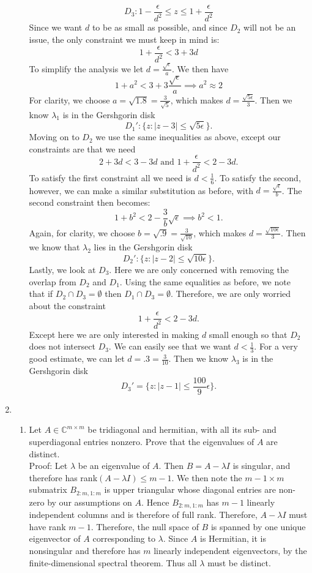 \documentclass[12pt]{article}
\numberwithin{equation}{section}
\begin{document}
\begin{enumerate}
\begin{enumerate}
    $$D_3:1-\frac{\epsilon}{d^2}\leq z\leq 1+\frac{\epsilon}{d^2}$$
    Since we want $d$ to be as small as possible, and since $D_2$ will not be an issue, the only constraint we must keep in mind is:
    $$ 1+\frac{\epsilon}{d^2}<3+3d$$
    To simplify the analysis we let $d=\frac{\sqrt{\epsilon}}{a}$. We then have
    $$1+a^2<3+3\frac{\sqrt{\epsilon}}{a}\implies a^2\approx 2$$
    For clarity, we choose $a=\sqrt{1.8}=\frac{3}{\sqrt{5}}$, which makes $d=\frac{\sqrt{5\epsilon}}{3}$. Then we know $\lambda_1$ is in the Gershgorin disk
    $$D_1':\{z:|z-3| \leq \sqrt{5\epsilon}\}.$$
    Moving on to $D_2$ we use the same inequalities as above, except our constraints are that we need
    $$2+3d<3-3d\text{  and  }1+\frac{\epsilon}{d^2}<2-3d.$$
    To satisfy the first constraint all we need is $d<\frac{1}{6}.$ To satisfy the second, however, we can make a similar substitution as before, with $d=\frac{\sqrt{\epsilon}}{b}$. The second constraint then becomes:
    $$1+b^2<2-\frac{3}{b}\sqrt{\epsilon}\implies b^2<1.$$
    Again, for clarity, we choose $b=\sqrt{.9}=\frac{3}{\sqrt{10}}$, which makes $d=\frac{\sqrt{10\epsilon}}{3}$. Then we know that $\lambda_2$ lies in the Gershgorin disk
    $$D_2':\{z:|z-2|\leq\sqrt{10\epsilon}\}.$$
    Lastly, we look at $D_3.$ Here we are only concerned with removing the overlap from $D_2$ and $D_1$. Using the same equalities as before, we note that if $D_2\cap D_3=\emptyset$ then $D_1\cap D_3=\emptyset$. Therefore, we are only worried about the constraint
    $$ 1+\frac{\epsilon}{d^2}<2-3d.$$
    Except here we are only interested in making $d$ small enough so that $D_2$ does not intersect $D_3$. We can easily see that we want $d<\frac{1}{3}$. For a very good estimate, we can let $d=.3=\frac{3}{10}$. Then we know $\lambda_3$ is in the Gershgorin disk
    $$D_3'=\{z:|z-1|\leq \frac{100}{9}\epsilon\}.$$
    \end{enumerate}

    \item \begin{enumerate}
        \item Let $A\in\mathbb{C}^{m\times m}$ be tridiagonal and hermitian, with all its sub- and superdiagonal entries nonzero. Prove that the eigenvalues of $A$ are distinct.\\

            Proof: Let $\lambda$ be an eigenvalue of $A$. Then $B=A-\lambda I$ is singular, and therefore has rank$(A-\lambda I)\leq m-1$. We then note the $m-1\times m$ submatrix $B_{2:m,1:m}$ is upper triangular whose diagonal entries are non-zero by our assumptions on $A$. Hence $B_{2:m,1:m}$ has $m-1$ linearly independent columns and is therefore of full rank. Therefore, $A-\lambda I$ must have rank $m-1$. Therefore, the null space of $B$ is spanned by one unique eigenvector of $A$ corresponding to $\lambda$. Since $A$ is Hermitian, it is nonsingular and therefore has $m$ linearly independent eigenvectors, by the finite-dimensional spectral theorem. Thus all $\lambda$ must be distinct.


\end{enumerate}
\end{enumerate}
\end{document}
